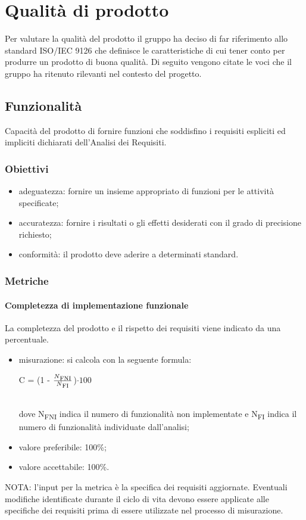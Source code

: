 \section{Qualità di prodotto}
Per valutare la qualità del prodotto il gruppo ha deciso di far riferimento allo standard ISO/IEC 9126\glosp{} che definisce le caratteristiche di cui tener conto per produrre un prodotto di buona qualità.
Di seguito vengono citate le voci che il gruppo ha ritenuto rilevanti nel contesto del progetto.
	\subsection{Funzionalità}
	Capacità del prodotto di fornire funzioni che soddisfino i requisiti espliciti ed impliciti dichiarati dell'Analisi dei Requisiti.
		\subsubsection{Obiettivi}
		\begin{itemize}
			\item adeguatezza: fornire un insieme appropriato di funzioni per le attività specificate;
			\item accuratezza: fornire i risultati o gli effetti desiderati con il grado di precisione richiesto;
			\item conformità: il prodotto deve aderire a determinati standard. %
		\end{itemize}
		\subsubsection{Metriche}
			\paragraph{Completezza di implementazione funzionale}
			La completezza del prodotto e il rispetto dei requisiti viene indicato da una percentuale.
			\begin{itemize}
			\item misurazione: si calcola con la seguente formula: \\
			\centerline { C = (1 - \(\frac{N\textsubscript{FNI}}{N\textsubscript{FI}} \))$ \cdot  100$ } \\
			dove N\textsubscript{FNI} indica il numero di funzionalità non implementate e N\textsubscript{FI} indica il numero di funzionalità individuate dall'analisi;
			\item valore preferibile: 100\%;
			\item valore accettabile: 100\%.
			\end{itemize}
			NOTA: l'input per la metrica è la specifica dei requisiti aggiornate. Eventuali modifiche identificate durante il ciclo di vita devono essere applicate alle specifiche dei requisiti prima di essere utilizzate nel processo di misurazione.
